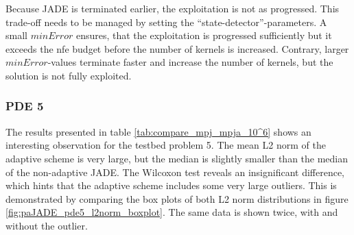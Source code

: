 \documentclass[./\jobname.tex]{subfiles}
\begin{document}
\begin{figure}[H]
	\centering
	\noindent{}
	\label{fig:subexperiment_pde2347_kernels_l2norm}
\end{figure}

Because JADE is terminated earlier, the exploitation is not as progressed. This trade-off needs to be managed by setting the ``state-detector''-parameters. A small $minError$ ensures, that the exploitation is progressed sufficiently but it exceeds the \gls{nfe} budget before the number of kernels is increased. Contrary, larger $minError$-values terminate faster and increase the number of kernels, but the solution is not fully exploited. 

\subsubsection{PDE 5}

The results presented in table \ref{tab:compare_mpj_mpja_10^6} shows an interesting observation for the testbed problem 5. The mean L2 norm of the adaptive scheme is very large, but the median is slightly smaller than the median of the non-adaptive JADE. The Wilcoxon test reveals an insignificant difference, which hints that the adaptive scheme includes some very large outliers. This is demonstrated by comparing the box plots of both L2 norm distributions in figure \ref{fig:paJADE_pde5_l2norm_boxplot}. The same data is shown twice, with and without the outlier. 
\end{document}
